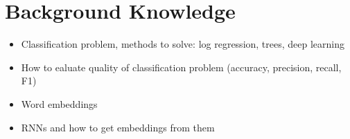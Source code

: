 \chapter{Background Knowledge}
\label{ch:background-knowledge}


\begin{itemize}
    \item Classification problem, methods to solve: log regression, trees, deep learning
    \item How to ealuate quality of classification problem (accuracy, precision, recall, F1)
    \item Word embeddings
    \item RNNs and how to get embeddings from them
\end{itemize}

